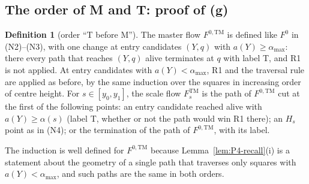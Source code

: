 \documentclass[11pt]{amsart}
\newcommand{\amax}{\alpha_{\max}}
\newcommand{\Fz}{F^{0}}
\theoremstyle{definition}
\newtheorem{definition}[theorem]{Definition}
\theoremstyle{remark}
\numberwithin{equation}{section}
\begin{document}
\subsection{The order of M and T: proof of (g)}\label{ssec:P4-g}

\begin{definition}[order ``T before M'']\label{def:P4-TM}
The master flow $F^{0,\mathrm{TM}}$ is defined like $\Fz$ in (N2)--(N3), with one change at entry candidates $(Y,q)$ with $a(Y)\ge\amax$: there every path that reaches $(Y,q)$ alive terminates at $q$ with label T, and R1 is not applied. At entry candidates with $a(Y)<\amax$, R1 and the traversal rule are applied as before, by the same induction over the squares in increasing order of centre height. For $s\in[y_0,y_1]$, the scale flow $F^{\mathrm{TM}}_s$ is the path of $F^{0,\mathrm{TM}}$ cut at the first of the following points: an entry candidate reached alive with $a(Y)\ge\alpha(s)$ (label T, whether or not the path would win R1 there); an $H_s$ point as in (N4); or the termination of the path of $F^{0,\mathrm{TM}}$, with its label.
\end{definition}

The induction is well defined for $F^{0,\mathrm{TM}}$ because Lemma~\ref{lem:P4-recall}(i) is a statement about the geometry of a single path that traverses only squares with $a(Y)<\amax$, and such paths are the same in both orders.
\end{document}
